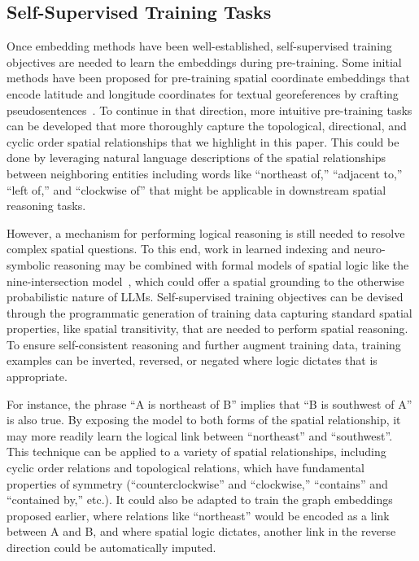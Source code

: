 \subsection{Self-Supervised Training Tasks}
Once embedding methods have been well-established, self-supervised training objectives are needed to learn the embeddings during pre-training.
%
Some initial methods have been proposed for pre-training spatial coordinate embeddings that encode latitude and longitude coordinates for textual georeferences by crafting pseudosentences~\cite{Li2021}.
To continue in that direction, more intuitive pre-training tasks can be developed that more thoroughly capture the topological, directional, and cyclic order spatial relationships that we highlight in this paper.
This could be done by leveraging natural language descriptions of the spatial relationships between neighboring entities including words like ``northeast of,'' ``adjacent to,'' ``left of,'' and ``clockwise of'' that might be applicable in downstream spatial reasoning tasks.

However, a mechanism for performing logical reasoning is still needed to resolve complex spatial questions.
To this end, work in learned indexing and neuro-symbolic reasoning may be combined with formal models of spatial logic like the nine-intersection model~\cite{Strobl2008}, which could offer a spatial grounding to the otherwise probabilistic nature of LLMs.
Self-supervised training objectives can be devised through the programmatic generation of training data capturing standard spatial properties, like spatial transitivity, that are needed to perform spatial reasoning.
To ensure self-consistent reasoning and further augment training data, training examples can be inverted, reversed, or negated where logic dictates that is appropriate.

For instance, the phrase ``A is northeast of B'' implies that ``B is southwest of A'' is also true.
By exposing the model to both forms of the spatial relationship, it may more readily learn the logical link between ``northeast'' and ``southwest''.
This technique can be applied to a variety of spatial relationships, including cyclic order relations and topological relations, which have fundamental properties of symmetry (``counterclockwise'' and ``clockwise,'' ``contains'' and ``contained by,'' etc.).
It could also be adapted to train the graph embeddings proposed earlier, where relations like ``northeast'' would be encoded as a link between A and B, and where spatial logic dictates, another link in the reverse direction could be automatically imputed.


